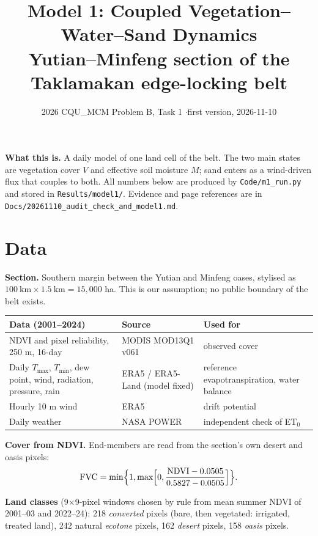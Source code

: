 \documentclass[11pt,a4paper]{article}
\title{Model 1: Coupled Vegetation--Water--Sand Dynamics\\[2pt]\large Yutian--Minfeng section of the Taklamakan edge-locking belt}
\author{2026 CQU\_MCM Problem B, Task 1 \quad$\cdot$\quad first version, 2026-11-10}
\date{}
\begin{document}
\maketitle

\noindent\textbf{What this is.} A daily model of one land cell of the belt. The two main states are vegetation cover $V$ and effective soil moisture $M$; sand enters as a wind-driven flux that couples to both. All numbers below are produced by \texttt{Code/m1\_run.py} and stored in \texttt{Results/model1/}. Evidence and page references are in \texttt{Docs/20261110\_audit\_check\_and\_model1.md}.

\section{Data}
\textbf{Section.} Southern margin between the Yutian and Minfeng oases, stylised as $100\ \text{km}\times1.5\ \text{km}=15{,}000$ ha. This is our assumption; no public boundary of the belt exists.

\begin{table}[H]\small
\begin{tabularx}{\linewidth}{@{}p{4.6cm}p{4.4cm}L@{}}
\toprule
Data (2001--2024) & Source & Used for\\
\midrule
NDVI and pixel reliability, 250 m, 16-day & MODIS MOD13Q1 v061 & observed cover\\
Daily $T_{\max}$, $T_{\min}$, dew point, wind, radiation, pressure, rain & ERA5 / ERA5-Land (model fixed) & reference evapotranspiration, water balance\\
Hourly 10 m wind & ERA5 & drift potential\\
Daily weather & NASA POWER & independent check of ET$_0$\\
\bottomrule
\end{tabularx}
\end{table}

\textbf{Cover from NDVI.} End-members are read from the section's own desert and oasis pixels:
\begin{equation}
\mathrm{FVC}=\min\Bigl\{1,\max\Bigl[0,\frac{\mathrm{NDVI}-0.0505}{0.5827-0.0505}\Bigr]\Bigr\}.
\end{equation}

\textbf{Land classes} (9$\times$9-pixel windows chosen by rule from mean summer NDVI of 2001--03 and 2022--24): 218 \emph{converted} pixels (bare, then vegetated: irrigated, treated land), 242 natural \emph{ecotone} pixels, 162 \emph{desert} pixels, 158 \emph{oasis} pixels.
\end{document}
